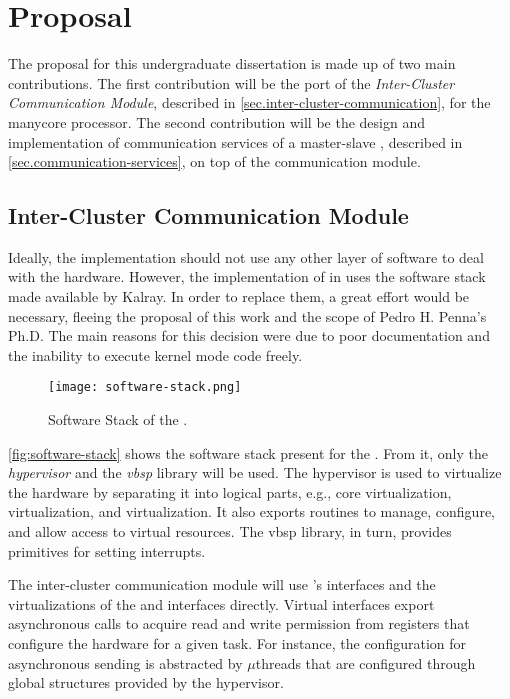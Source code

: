 \chapter{Proposal}
\label{ch.proposal}

The proposal for this undergraduate dissertation is made up of two main contributions.
The first contribution will be the port of the \textit{Inter-Cluster Communication Module},
described in \autoref{sec.inter-cluster-communication}, for the \mppa manycore processor.
The second contribution will be the design and implementation of communication services
of a master-slave \os, described in \autoref{sec.communication-services}, on top of
the communication module.

\section{Inter-Cluster Communication Module}

	Ideally, the \hal implementation should not use any other layer of software to
	deal with the hardware. However, the implementation of \hal in \mppa uses the
	software stack made available by Kalray.
	In order to replace them, a great effort would be necessary, fleeing the proposal
	of this work and the scope of Pedro H. Penna's Ph.D.
	The main reasons for this decision were due to poor documentation and the
	inability to execute kernel mode code freely.

	\begin{figure}[t]
		\centering
		\caption{Software Stack of the \mppa.}
		\label{fig:software-stack}
		\texttt{[image: software-stack.png]}
	\end{figure}

	\autoref{fig:software-stack} shows the software stack present for the \mppa.
	From it, only the \textit{hypervisor} and the \textit{vbsp} library will be used.
	The hypervisor is used to virtualize the hardware by separating it into logical
	parts, e.g., core virtualization, \cnoc virtualization, and \dnoc virtualization.
	It also exports routines to manage, configure, and allow access to virtual resources.
	The vbsp library, in turn, provides primitives for setting interrupts.

	The inter-cluster communication module will use \hal's interfaces and the
	virtualizations of the \cnoc and \dnoc interfaces directly.
	Virtual \noc interfaces export asynchronous calls to acquire read and write
	permission from registers that configure the hardware for a given task.
	For instance, the \dma configuration for asynchronous sending is abstracted by
	$\mu$threads that are configured through global structures provided by the hypervisor.

